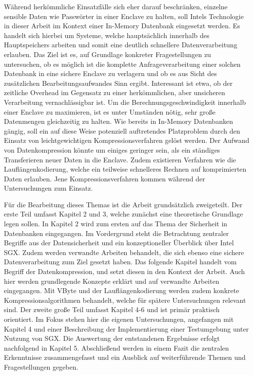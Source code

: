 Während herkömmliche Einsatzfälle sich eher darauf beschränken, einzelne sensible Daten wie Passwörter in einer Enclave zu halten, soll Intels Technologie in dieser Arbeit im Kontext einer In-Memory Datenbank eingesetzt werden. Es handelt sich hierbei um Systeme, welche hauptsächlich innerhalb des Hauptspeichers arbeiten und somit eine deutlich schnellere Datenverarbeitung erlauben. Das Ziel ist es, auf Grundlage konkreter Fragestellungen zu untersuchen, ob es  möglich ist die komplette Anfrageverarbeitung einer solchen Datenbank in eine sichere Enclave zu verlagern und ob es aus Sicht des zusätzlichen Bearbeitungsaufwandes Sinn ergibt. Interessant ist etwa, ob der zeitliche Overhead im Gegensatz zu einer herkömmlichen, aber unsicheren Verarbeitung vernachlässigbar ist. Um die Berechnungsgeschwindigkeit innerhalb einer Enclave zu maximieren, ist es unter Umständen nötig, sehr große Datenmengen gleichzeitig zu halten. Wie bereits in In-Memory Datenbanken gängig, soll ein auf diese Weise potenziell auftretendes Platzproblem durch den Einsatz von leichtgewichtigen Kompressionsverfahren gelöst werden. Der Aufwand von Datenkompression könnte um einiges geringer sein, als ein ständiges Transferieren neuer Daten in die Enclave. Zudem existieren Verfahren wie die Lauflängenkodierung, welche ein teilweise schnelleres Rechnen auf komprimierten Daten erlauben. Jene Kompressionsverfahren kommen während der Untersuchungen zum Einsatz.

Für die Bearbeitung dieses Themas ist die Arbeit grundsätzlich zweigeteilt. Der erste Teil umfasst Kapitel 2 und 3, welche zunächst eine theoretische Grundlage legen sollen. In Kapitel 2 wird zum ersten auf das Thema der Sicherheit in Datenbanken eingegangen. Im Vordergrund steht die Betrachtung zentraler Begriffe aus der Datensicherheit und ein konzeptioneller Überblick über Intel SGX. Zudem werden verwandte Arbeiten behandelt, die sich ebenso eine sichere Datenverarbeitung zum Ziel gesetzt haben. Das folgende Kapitel handelt vom Begriff der Datenkompression, und setzt diesen in den Kontext der Arbeit. Auch hier werden grundlegende Konzepte erklärt und auf verwandte Arbeiten eingegangen. Mit VByte und der Lauflängenkodierung werden zudem konkrete Kompressionsalgorithmen behandelt, welche für spätere Untersuchungen relevant sind. Der zweite große Teil umfasst Kapitel 4-6 und ist primär praktisch orientiert. Im Fokus stehen hier die eigenen Untersuchungen, angefangen mit Kapitel 4 und einer Beschreibung der Implementierung einer Testumgebung unter Nutzung von SGX. Die Auswertung der entstandenen Ergebnisse erfolgt nachfolgend in Kapitel 5. Abschließend werden in einem Fazit die zentralen Erkenntnisse zusammengefasst und ein Ausblick auf weiterführende Themen und Fragestellungen gegeben.